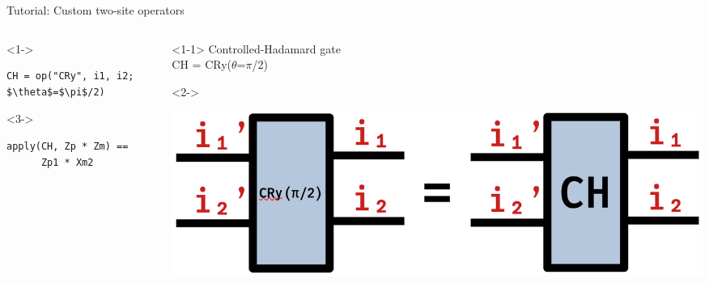 \begin{frame}[fragile]{Tutorial: Custom two-site operators}

\begin{columns}

\begin{column}{5.5cm}

\begin{onlyenv}<1->
\begin{lstlisting}[language=JuliaLocal, style=julia, mathescape, basicstyle=\small]
CH = op("CRy", i1, i2; $\theta$=$\pi$/2)
\end{lstlisting}
\end{onlyenv}

\begin{onlyenv}<3->
~\\
\begin{lstlisting}[language=JuliaLocal, style=julia, mathescape, basicstyle=\small]
apply(CH, Zp * Zm) ==
      Zp1 * Xm2
\end{lstlisting}
\end{onlyenv}

\end{column}

\begin{column}{4.5cm}

\begin{onlyenv}<1-1>
Controlled-Hadamard gate \\
CH = CRy($\theta$=$\pi$/2)
\end{onlyenv}

\begin{onlyenv}<2->
\vspace*{0.0cm}
\begin{center}
\includegraphics[width=1.0\textwidth]{
  slides/assets/CH12.png
}
\end{center}
\vspace*{0.0cm}
\end{onlyenv}



\end{column}
\end{columns}
\end{frame}
